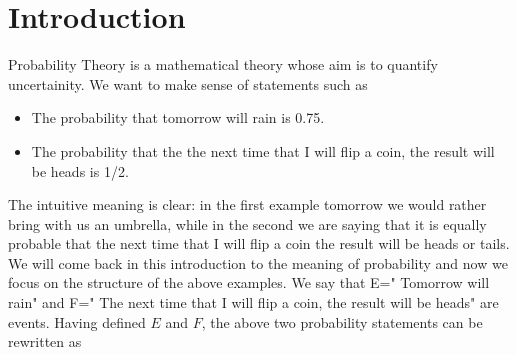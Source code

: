 \documentclass[reqno]{amsart}
\newcommand{\<}{{\langle \!\! \langle}}
\renewcommand{\>}{{\rangle \!\! \rangle}}
\begin{document}


\section{Introduction}

Probability Theory is a mathematical theory whose aim is to quantify uncertainity. We want to make sense of statements such as  
\begin{itemize}

	\item  The probability that tomorrow will rain is 0.75.\\
	\item  The probability that the the next time that I will flip a coin, the result will be heads is 1/2.\\ 

\end{itemize}

The intuitive meaning is clear: in the first example tomorrow we would rather bring with us an umbrella, while in the second we are saying that it is equally probable that the next time that I will flip a coin the result will be heads or tails. \\
We will come back in this introduction to the meaning of probability and now we focus on the structure of the above examples. We say that  E=" Tomorrow will rain" and F=" The next time that I will flip a coin, the result will be heads" are events. Having defined $E$ and $F$, the above two probability statements can be rewritten as 
\end{document}
